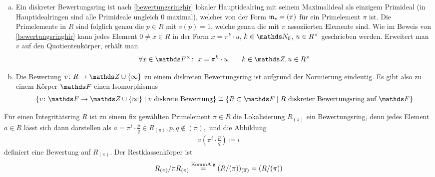 \documentclass[ngerman,fontsize=11pt, paper=a4, parskip=half, titlepage=true, toc=bib]{scrartcl}
\begin{document}
\begin{Bem}\label{darstellungdbk}
  \begin{enumerate}[a)]
  \item Ein diskreter Bewertungsring ist nach \ref{bewertungsringhir}
    lokaler Hauptidealring mit seinem Maximalideal als einzigem 
    Primideal (in Hauptidealringen sind alle Primideale ungleich 0 maximal),
    welches von der Form $\mathfrak{m}_v=(\pi)$ für ein Primelement $\pi$ ist.
    Die Primelemente in $R$ sind folglich genau die $p\in R$ mit $v(p)=1$, 
    welche genau die mit $\pi$ assoziierten Elemente sind.
    Wie im Beweis von \ref{bewertungsringhir} kann jedes Element $0\neq x\in R$
    in der Form $x=\pi^k\cdot u$, $k\in\N_0$, $u\in R^\times$ 
    geschrieben werden.
    Erweitert man $v$ auf den Quotientenkörper, erhält man
    \begin{gather*}
      \forall x\in \Fx\colon\;
      x=\pi^k\cdot u
      \qquad k\in\Z, u\in \Rx
    \end{gather*}
  \item Die Bewertung $v\colon R\to\Z\cup\{\infty\}$ zu einem diskreten
    Bewertungsring ist aufgrund der Normierung eindeutig.
    Es gibt also zu einem Körper $\F$ einen Isomorphismus
    \begin{gather*}
      \{v\colon \F\to\Z\cup\{\infty\} 
      \mid \text{$v$ diskrete Bewertung}\}
      \cong 
      \{R\subset \F\mid \text{$R$ diskreter Bewertungsring auf $\F$}\}
    \end{gather*}
  \end{enumerate}
\end{Bem}

\begin{Bsp}\label{p-adischebewertung}
  Für einen Integritätsring $R$ ist zu einem fix gewählten 
  Primelement $\pi\in R$ die Lokalisierung $R_{(\pi)}$ ein 
  Bewertungsring, denn jedes Element
  $a\in R$ lässt sich dann darstellen als $a=\pi^i\cdot \frac{p}{q}\in
  R_{(\pi)},p,q\not\in(\pi),$ und die Abbildung
  \begin{gather*}
    v\left(\pi^i\cdot \frac{p}{q}\right)\coloneqq i
  \end{gather*}
  definiert eine Bewertung auf $R_{(\pi)}$.
  Der Restklassenkörper ist 
  \begin{gather*}
    R_{(\pi)}/\pi R_{(\pi)}
    \overset{\text{KommAlg}}{=}(R/(\pi))_{(\overline{\pi})}
    =(R/(\pi))
  \end{gather*}
\end{Bsp}
\end{document}
